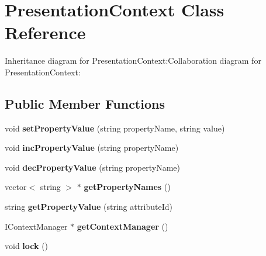 \section{PresentationContext Class Reference}
\label{classbr_1_1pucrio_1_1telemidia_1_1ginga_1_1ncl_1_1adaptation_1_1context_1_1PresentationContext}
Inheritance diagram for PresentationContext:Collaboration diagram for PresentationContext:\subsection*{Public Member Functions}
\begin{CompactItemize}
\item 
void \textbf{setPropertyValue} (string propertyName, string value)\label{classbr_1_1pucrio_1_1telemidia_1_1ginga_1_1ncl_1_1adaptation_1_1context_1_1PresentationContext_609bc7d01f8f8f74082c9794891d2ac4}

\item 
void \textbf{incPropertyValue} (string propertyName)\label{classbr_1_1pucrio_1_1telemidia_1_1ginga_1_1ncl_1_1adaptation_1_1context_1_1PresentationContext_55dbcdf21cdac8d3e1ea3a042e1c4aaf}

\item 
void \textbf{decPropertyValue} (string propertyName)\label{classbr_1_1pucrio_1_1telemidia_1_1ginga_1_1ncl_1_1adaptation_1_1context_1_1PresentationContext_ee339c8cb431a4546d56db51dbaadb7d}

\item 
vector$<$ string $>$ $\ast$ \textbf{getPropertyNames} ()\label{classbr_1_1pucrio_1_1telemidia_1_1ginga_1_1ncl_1_1adaptation_1_1context_1_1PresentationContext_be172fa780339b3e50337c8c1abc89c1}

\item 
string \textbf{getPropertyValue} (string attributeId)\label{classbr_1_1pucrio_1_1telemidia_1_1ginga_1_1ncl_1_1adaptation_1_1context_1_1PresentationContext_20e80a53662c64c9f383d4c5f2b140d1}

\item 
IContextManager $\ast$ \textbf{getContextManager} ()\label{classbr_1_1pucrio_1_1telemidia_1_1ginga_1_1ncl_1_1adaptation_1_1context_1_1PresentationContext_02319e332202549b888a589a53d40bbe}

\item 
void {\bf lock} ()\label{classbr_1_1pucrio_1_1telemidia_1_1ginga_1_1ncl_1_1adaptation_1_1context_1_1PresentationContext_a81aed607133209dade63a226818224d}


\end{CompactItemize}
